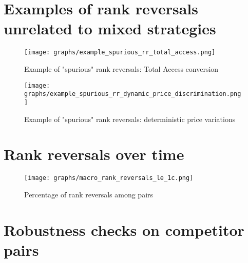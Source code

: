 \documentclass[english]{article}
\begin{document}
\newpage

\section{Examples of rank reversals unrelated to mixed strategies}

\begin{figure}[htb!]
    \caption{Example of "spurious" rank reversals: Total Access conversion}
	\centering
		\texttt{[image: graphs/example\_spurious\_rr\_total\_access.png]}
\label{fig:rr_total_access}
\end{figure}

\begin{figure}[htb!]
    \caption{Example of "spurious" rank reversals: deterministic price variations}
	\centering
\texttt{[image: graphs/example\_spurious\_rr\_dynamic\_price\_discrimination.png]}
\label{fig:rr_dynamic_price_discrimination}
\end{figure}

\section{Rank reversals over time}

\begin{figure}[htb!]
    \caption{Percentage of rank reversals among pairs}
    \label{fig:pct_reversed_pairs}
	\centering
		\texttt{[image: graphs/macro\_rank\_reversals\_le\_1c.png]}
\end{figure}

\section{Robustness checks on competitor pairs}
\end{document}
